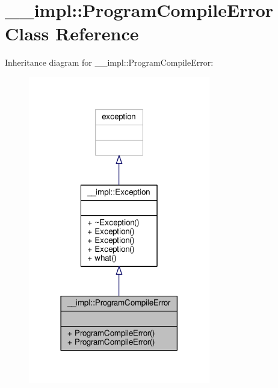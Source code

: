 \hypertarget{class____impl_1_1ProgramCompileError}{}\section{\+\_\+\+\_\+impl\+:\+:Program\+Compile\+Error Class Reference}
\label{class____impl_1_1ProgramCompileError}


Inheritance diagram for \+\_\+\+\_\+impl\+:\+:Program\+Compile\+Error\+:
\nopagebreak
\begin{figure}[H]
\begin{center}
\leavevmode
\includegraphics[width=225pt]{db/d73/class____impl_1_1ProgramCompileError__inherit__graph}
\end{center}
\end{figure}


